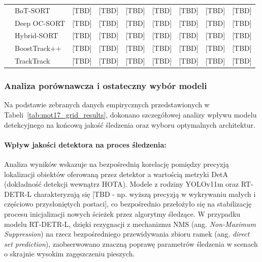 \begin{table}[htbp]
\begin{tabular}{llccccccc}
                      & BoT-SORT         & [TBD]              & [TBD]              & [TBD]              & [TBD]              & [TBD]              & [TBD]         & [TBD]        \\
                      & Deep OC-SORT     & [TBD]              & [TBD]              & [TBD]              & [TBD]              & [TBD]              & [TBD]         & [TBD]        \\
                      & Hybrid-SORT      & [TBD]              & [TBD]              & [TBD]              & [TBD]              & [TBD]              & [TBD]         & [TBD]        \\
                      & BoostTrack++     & [TBD]              & [TBD]              & [TBD]              & [TBD]              & [TBD]              & [TBD]         & [TBD]        \\
                      & TrackTrack       & [TBD]              & [TBD]              & [TBD]              & [TBD]              & [TBD]              & [TBD]         & [TBD]        \\
    \bottomrule
  \end{tabular}
\end{table}

\subsubsection{Analiza porównawcza i ostateczny wybór modeli}
Na podstawie zebranych danych empirycznych przedstawionych w Tabeli~\ref{tab:mot17_grid_results},
dokonano szczegółowej analizy wpływu modelu detekcyjnego na końcową jakość śledzenia oraz wyboru
optymalnych architektur.

\paragraph{Wpływ jakości detektora na proces śledzenia:}
Analiza wyników wskazuje na bezpośrednią korelację pomiędzy precyzją lokalizacji obiektów oferowaną
przez detektor a wartością metryki DetA (dokładność detekcji wewnątrz HOTA). Modele z rodziny
YOLOv11m oraz RT-DETR-L charakteryzują się [TBD - np. wyższą precyzją w wykrywaniu małych i
  częściowo przysłoniętych postaci], co bezpośrednio przełożyło się na stabilizację procesu
inicjalizacji nowych ścieżek przez algorytmy śledzące. W przypadku modelu RT-DETR-L, dzięki
rezygnacji z mechanizmu NMS (ang. \textit{Non-Maximum Suppression}) na rzecz bezpośredniego
przewidywania zbioru ramek (ang. \textit{direct set prediction}), zaobserwowano znaczną poprawę
parametrów śledzenia w scenach o skrajnie wysokim zagęszczeniu pieszych.


